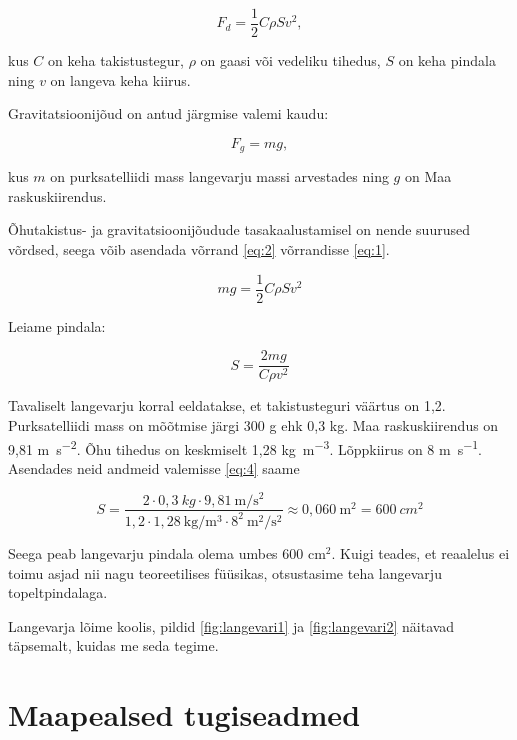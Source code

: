 \begin{equation}\label{eq:1}
F_d = \frac{1}{2}C\rho Sv^2,
\end{equation}

kus \(C\) on keha takistustegur, \(\rho\) on gaasi või vedeliku tihedus, \(S\) on keha pindala ning \(v\) on langeva keha kiirus. 

Gravitatsioonijõud on antud järgmise valemi kaudu:

\begin{equation}\label{eq:2}
F_g = mg,
\end{equation}

kus \(m\) on purksatelliidi mass langevarju massi arvestades ning \(g\) on Maa raskuskiirendus.

Õhutakistus- ja gravitatsioonijõudude tasakaalustamisel on nende suurused võrdsed, seega võib asendada võrrand \ref{eq:2} võrrandisse \ref{eq:1}.

\begin{equation}\label{eq:3}
mg = \frac{1}{2}C\rho Sv^2
\end{equation}

Leiame pindala:

\begin{equation}\label{eq:4}
S = \frac{2mg}{C\rho v^2}
\end{equation}

Tavaliselt langevarju korral eeldatakse, et takistusteguri väärtus on 1,2. Purksatelliidi mass on mõõtmise järgi 300 g ehk 0,3 kg. Maa raskuskiirendus on 9,81 \si{\meter\per\second\squared}. Õhu tihedus on keskmiselt 1,28 \si{\kilo\gram\per\meter\cubed}. Lõppkiirus on 8 \si{\meter\per\second}. Asendades neid andmeid valemisse \ref{eq:4} saame

\[S = \frac{2\cdot0,3\:\si{kg}\cdot9,81\:\si{\meter\per\second\squared}}{1,2\cdot1,28\:\si{\kilo\gram\per\meter\cubed}\cdot8^2\:\si{\meter\squared\per\second\squared}} \approx 0,060\:\si{\meter\squared} = 600\:\si{cm^2}\]

Seega peab langevarju pindala olema umbes 600 cm$^2$. Kuigi teades, et reaalelus ei toimu asjad nii nagu teoreetilises füüsikas, otsustasime teha langevarju topeltpindalaga.

Langevarja lõime koolis, pildid \ref{fig:langevari1} ja \ref{fig:langevari2} näitavad täpsemalt, kuidas me seda tegime.

\section{Maapealsed tugiseadmed}

